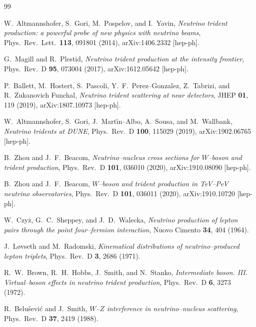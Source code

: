 \begin{thebibliography}{99}

W.~Altmannshofer, S.~Gori, M.~Pospelov, and I.~Yavin,
\emph{Neutrino trident production: a powerful probe of new physics
with neutrino beams},
Phys.\ Rev.\ Lett.\ \textbf{113}, 091801 (2014),
arXiv:1406.2332 [hep-ph].

G.~Magill and R.~Plestid,
\emph{Neutrino trident production at the intensity frontier},
Phys.\ Rev.\ D \textbf{95}, 073004 (2017),
arXiv:1612.05642 [hep-ph].

P.~Ballett, M.~Hostert, S.~Pascoli, Y.~F.~Perez--Gonzalez, Z.~Tabrizi,
and R.~Zukanovich Funchal,
\emph{Neutrino trident scattering at near detectors},
JHEP \textbf{01}, 119 (2019),
arXiv:1807.10973 [hep-ph].

W.~Altmannshofer, S.~Gori, J.~Mart\'\i n--Albo, A.~Sousa, and
M.~Wallbank,
\emph{Neutrino tridents at DUNE},
Phys.\ Rev.\ D \textbf{100}, 115029 (2019),
arXiv:1902.06765 [hep-ph].

B.~Zhou and J.~F.~Beacom,
\emph{Neutrino--nucleus cross sections for $W$--boson and trident
production},
Phys.\ Rev.\ D \textbf{101}, 036010 (2020),
arXiv:1910.08090 [hep-ph].

B.~Zhou and J.~F.~Beacom,
\emph{$W$--boson and trident production in TeV--PeV neutrino
observatories},
Phys.\ Rev.\ D \textbf{101}, 036011 (2020),
arXiv:1910.10720 [hep-ph].

W.~Czy\.z, G.~C.~Sheppey, and J.~D.~Walecka,
\emph{Neutrino production of lepton pairs through the point
four--fermion interaction},
Nuovo Cimento \textbf{34}, 404 (1964).

J.~L\o vseth and M.~Radomski,
\emph{Kinematical distributions of neutrino--produced lepton triplets},
Phys.\ Rev.\ D \textbf{3}, 2686 (1971).

R.~W.~Brown, R.~H.~Hobbs, J.~Smith, and N.~Stanko,
\emph{Intermediate boson. III. Virtual--boson effects in
neutrino trident production},
Phys.\ Rev.\ D \textbf{6}, 3273 (1972).

R.~Belu\v{s}evi\'c and J.~Smith,
\emph{$W$--$Z$ interference in neutrino--nucleus scattering},
Phys.\ Rev.\ D \textbf{37}, 2419 (1988).


\end{thebibliography}
